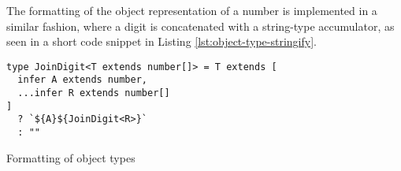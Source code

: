 The formatting of the object representation of a number is implemented in a similar fashion, where a digit is concatenated with a string-type accumulator, as seen in a short code snippet in Listing \ref{lst:object-type-stringify}.

\begin{listing}[ht]
  \begin{verbatim}
type JoinDigit<T extends number[]> = T extends [
  infer A extends number,
  ...infer R extends number[]
]
  ? `${A}${JoinDigit<R>}`
  : ""
\end{verbatim}
  \caption{Formatting of object types}\label{lst:object-type-stringify}
\end{listing}